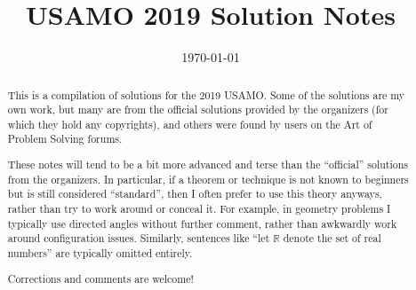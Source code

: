 \documentclass[11pt]{scrartcl}
\title{USAMO 2019 Solution Notes}
\date{\today}
\begin{document}
\maketitle

\begin{abstract}
This is a compilation of solutions
for the 2019 USAMO.
Some of the solutions are my own work,
but many are from the official solutions provided by the organizers
(for which they hold any copyrights),
and others were found by users on the Art of Problem Solving forums.

These notes will tend to be a bit more advanced and terse than the ``official''
solutions from the organizers.
In particular, if a theorem or technique is not known to beginners
but is still considered ``standard'', then I often prefer to
use this theory anyways, rather than try to work around or conceal it.
For example, in geometry problems I typically use directed angles
without further comment, rather than awkwardly work around configuration issues.
Similarly, sentences like ``let $\mathbb{R}$ denote the set of real numbers''
are typically omitted entirely.

Corrections and comments are welcome!
\end{abstract}

\tableofcontents
\newpage

\addtocounter{section}{-1}
\end{document}
